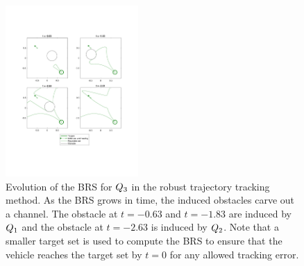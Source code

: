 \begin{figure}[h]
  \centering
  \includegraphics[width=0.45\textwidth]{"fig/rtt_rs3"}
  \caption{Evolution of the BRS for $Q_3$ in the robust trajectory tracking method. As the BRS grows in time, the induced obstacles carve out a channel. The obstacle at $t =-0.63$ and $t=-1.83$ are induced by $Q_1$ and the obstacle at $t =-2.63$ is induced by $Q_2$. Note that a smaller target set is used to compute the BRS to ensure that the vehicle reaches the target set by $t=0$ for any allowed tracking error.}
  \label{fig:rtt_rs3}
\end{figure}